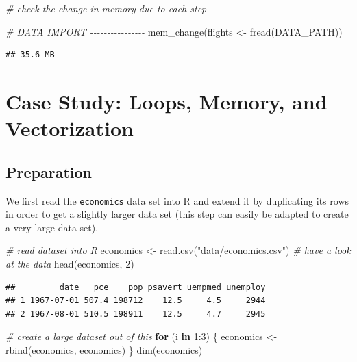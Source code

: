 \documentclass[
  12pt,
]{style/krantz}
\newenvironment{Shaded}{\begin{snugshade}}{\end{snugshade}}
\newcommand{\CommentTok}[1]{\textcolor[rgb]{0.56,0.35,0.01}{\textit{#1}}}
\newcommand{\ControlFlowTok}[1]{\textcolor[rgb]{0.13,0.29,0.53}{\textbf{#1}}}
\newcommand{\DecValTok}[1]{\textcolor[rgb]{0.00,0.00,0.81}{#1}}
\newcommand{\FunctionTok}[1]{\textcolor[rgb]{0.00,0.00,0.00}{#1}}
\newcommand{\NormalTok}[1]{#1}
\newcommand{\OtherTok}[1]{\textcolor[rgb]{0.56,0.35,0.01}{#1}}
\newcommand{\SpecialCharTok}[1]{\textcolor[rgb]{0.00,0.00,0.00}{#1}}
\newcommand{\StringTok}[1]{\textcolor[rgb]{0.31,0.60,0.02}{#1}}
\begin{document}
\begin{Shaded}
\begin{Highlighting}[]
\CommentTok{\# check the change in memory due to each step}

\CommentTok{\# DATA IMPORT {-}{-}{-}{-}{-}{-}{-}{-}{-}{-}{-}{-}{-}{-}{-}{-}}
\FunctionTok{mem\_change}\NormalTok{(flights }\OtherTok{\textless{}{-}} \FunctionTok{fread}\NormalTok{(DATA\_PATH))}
\end{Highlighting}
\end{Shaded}

\begin{verbatim}
## 35.6 MB
\end{verbatim}

\hypertarget{case-study-loops-memory-and-vectorization}{%
\section{Case Study: Loops, Memory, and Vectorization}\label{case-study-loops-memory-and-vectorization}}

\hypertarget{preparation}{%
\subsection{Preparation}\label{preparation}}

We first read the \texttt{economics} data set into R and extend it by duplicating its rows in order to get a slightly larger data set (this step can easily be adapted to create a very large data set).

\begin{Shaded}
\begin{Highlighting}[]
\CommentTok{\# read dataset into R}
\NormalTok{economics }\OtherTok{\textless{}{-}} \FunctionTok{read.csv}\NormalTok{(}\StringTok{"data/economics.csv"}\NormalTok{)}
\CommentTok{\# have a look at the data}
\FunctionTok{head}\NormalTok{(economics, }\DecValTok{2}\NormalTok{)}
\end{Highlighting}
\end{Shaded}

\begin{verbatim}
##         date   pce    pop psavert uempmed unemploy
## 1 1967-07-01 507.4 198712    12.5     4.5     2944
## 2 1967-08-01 510.5 198911    12.5     4.7     2945
\end{verbatim}

\begin{Shaded}
\begin{Highlighting}[]
\CommentTok{\# create a \textquotesingle{}large\textquotesingle{} dataset out of this}
\ControlFlowTok{for}\NormalTok{ (i }\ControlFlowTok{in} \DecValTok{1}\SpecialCharTok{:}\DecValTok{3}\NormalTok{) \{}
\NormalTok{     economics }\OtherTok{\textless{}{-}} \FunctionTok{rbind}\NormalTok{(economics, economics)}
\NormalTok{\}}
\FunctionTok{dim}\NormalTok{(economics)}
\end{Highlighting}
\end{Shaded}
\end{document}
